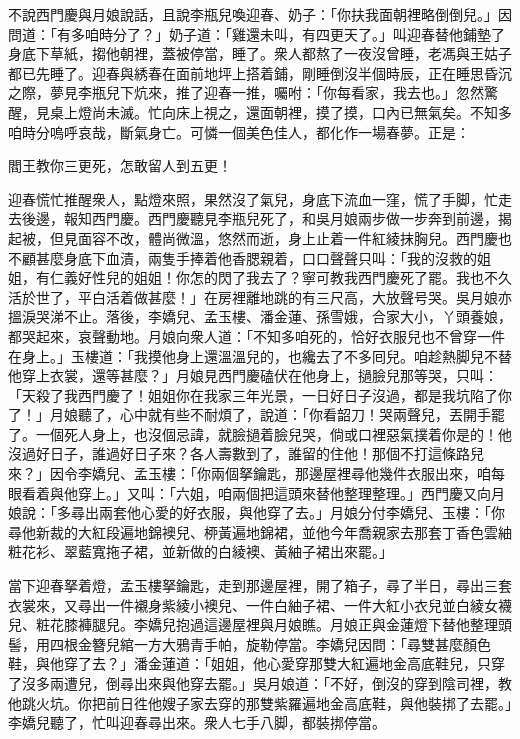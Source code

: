 不說西門慶與月娘說話，且說李瓶兒喚迎春、奶子：「你扶我面朝裡略倒倒兒。」因問道：「有多咱時分了？」奶子道：「雞還未叫，有四更天了。」叫迎春替他鋪墊了身底下草紙，搊他朝裡，蓋被停當，睡了。衆人都熬了一夜沒曾睡，老馮與王姑子都已先睡了。迎春與綉春在面前地坪上搭着鋪，剛睡倒沒半個時辰，正在睡思昏沉之際，夢見李瓶兒下炕來，推了迎春一推，囑咐：「你每看家，我去也。」忽然驚醒，見桌上燈尚未滅。忙向床上視之，還面朝裡，摸了摸，口內已無氣矣。不知多咱時分嗚呼哀哉，斷氣身亡。可憐一個美色佳人，都化作一場春夢。正是：

\begin{myquote}
閻王教你三更死，怎敢留人到五更！
\end{myquote}

迎春慌忙推醒衆人，點燈來照，果然沒了氣兒，身底下流血一窪，慌了手脚，忙走去後邊，報知西門慶。西門慶聽見李瓶兒死了，和吳月娘兩步做一步奔到前邊，揭起被，但見面容不改，體尚微溫，悠然而逝，身上止着一件紅綾抹胸兒。西門慶也不顧甚麼身底下血漬，兩隻手捧着他香腮親着，口口聲聲只叫：「我的沒救的姐姐，有仁義好性兒的姐姐！你怎的閃了我去了？寧可教我西門慶死了罷。我也不久活於世了，平白活着做甚麼！」在房裡離地跳的有三尺高，大放聲号哭。吳月娘亦搵淚哭涕不止。落後，李嬌兒、孟玉樓、潘金蓮、孫雪娥，合家大小，丫頭養娘，都哭起來，哀聲動地。月娘向衆人道：「不知多咱死的，恰好衣服兒也不曾穿一件在身上。」玉樓道：「我摸他身上還溫溫兒的，也纔去了不多囘兒。咱趁熱脚兒不替他穿上衣裳，還等甚麼？」月娘見西門慶磕伏在他身上，撾臉兒那等哭，只叫：「天殺了我西門慶了！姐姐你在我家三年光景，一日好日子沒過，{}都是我坑陷了你了！」{}月娘聽了，心中就有些不耐煩了，說道：「你看韶刀！哭兩聲兒，丟開手罷了。一個死人身上，也沒個忌諱，就臉撾着臉兒哭，倘或口裡惡氣撲着你是的！他沒過好日子，誰過好日子來？{}各人壽數到了，誰留的住他！那個不打這條路兒來？」因令李嬌兒、孟玉樓：「你兩個拏鑰匙，那邊屋裡尋他幾件衣服出來，咱每眼看着與他穿上。」又叫：「六姐，咱兩個把這頭來替他整理整理。」西門慶又向月娘說：「多尋出兩套他心愛的好衣服，與他穿了去。」月娘分付李嬌兒、玉樓：「你尋他新裁的大紅段遍地錦襖兒、桺黃遍地錦裙，並他今年喬親家去那套丁香色雲紬粧花衫、翠藍寬拖子裙，並新做的白綾襖、黃紬子裙出來罷。」

當下迎春拏着燈，孟玉樓拏鑰匙，走到那邊屋裡，開了箱子，尋了半日，尋出三套衣裳來，又尋出一件襯身紫綾小襖兒、{}一件白紬子裙、一件大紅小衣兒並白綾女襪兒、粧花膝褲腿兒。李嬌兒抱過這邊屋裡與月娘瞧。月娘正與金蓮燈下替他整理頭髻，用四根金簪兒綰一方大鴉青手帕，旋勒停當。李嬌兒因問：「尋雙甚麼顏色鞋，與他穿了去？」潘金蓮道：「姐姐，他心愛穿那雙大紅遍地金高底鞋兒，只穿了沒多兩遭兒，倒尋出來與他穿去罷。」吳月娘道：「不好，倒沒的穿到陰司裡，教他跳火坑。你把前日徃他嫂子家去穿的那雙紫羅遍地金高底鞋，與他裝挷了去罷。」李嬌兒聽了，忙叫迎春尋出來。衆人七手八脚，都裝挷停當。

